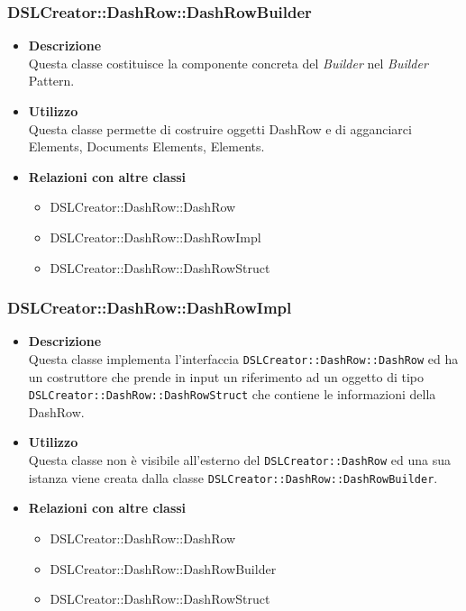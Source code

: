                 \subsubsection{DSLCreator::DashRow::DashRowBuilder}
                    \begin{itemize}
                        \item \textbf{Descrizione} \hfill \\
                            Questa classe costituisce la componente concreta del \textit{Builder} nel \textit{Builder} Pattern.
                        \item \textbf{Utilizzo} \hfill \\
                            Questa classe permette di costruire oggetti DashRow e di agganciarci  Elements, Documents Elements,  Elements.
                        \item \textbf{Relazioni con altre classi}
                            \begin{itemize}
                              \item DSLCreator::DashRow::DashRow
                              \item DSLCreator::DashRow::DashRowImpl
                              \item DSLCreator::DashRow::DashRowStruct
                            \end{itemize}
                    \end{itemize}

 \subsubsection{DSLCreator::DashRow::DashRowImpl}
                    \begin{itemize}
                        \item \textbf{Descrizione} \hfill \\
                            Questa classe implementa l'interfaccia \texttt{DSLCreator::DashRow::DashRow} ed ha un costruttore che prende in input un riferimento ad un oggetto di tipo \texttt{DSLCreator::Dash\-Row::DashRowStruct} che contiene le informazioni della DashRow.
                        \item \textbf{Utilizzo} \hfill \\
                            Questa classe non è visibile all'esterno del  \texttt{DSLCreator::DashRow} ed una sua istanza viene creata dalla classe \texttt{DSLCreator::DashRow::DashRowBuilder}.
                        \item \textbf{Relazioni con altre classi}
                            \begin{itemize}
                              \item DSLCreator::DashRow::DashRow
                              \item DSLCreator::DashRow::DashRowBuilder
                              \item DSLCreator::DashRow::DashRowStruct
                            \end{itemize}
                    \end{itemize}

